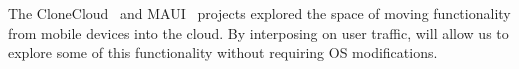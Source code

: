 The CloneCloud~\cite{chun:clonecloud} and MAUI~\cite{cuervo:maui} projects explored the space of moving functionality 
from mobile devices into the cloud. By interposing on user traffic, \meddle will allow us to explore some of this 
functionality without requiring OS modifications.


